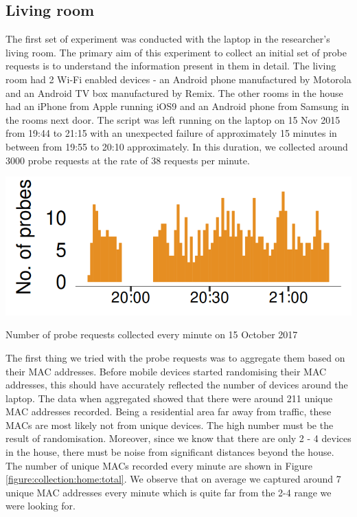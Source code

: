 \subsection{Living room}
The first set of experiment was conducted with the laptop in the researcher's living room.
The primary aim of this experiment to collect an initial set of probe requests is to understand the information present in them in detail.
The living room had 2 Wi-Fi enabled devices - an Android phone manufactured by Motorola and an Android TV box manufactured by Remix.
The other rooms in the house had an iPhone from Apple running iOS9 and an Android phone from Samsung in the rooms next door.
The script was left running on the laptop on 15 Nov 2015 from 19:44 to 21:15 with an unexpected failure of approximately 15 minutes in between from 19:55 to 20:10 approximately.
In this duration, we collected around 3000 probe requests at the rate of 38 requests per minute.

\begin{marginfigure}[-5cm]
  \includegraphics{images/home-total-count.png}
  \caption{Number of probe requests collected every minute on 15 October 2017}
  \label{figure:collection:home:total}
\end{marginfigure}

The first thing we tried with the probe requests was to aggregate them based on their MAC addresses.
Before mobile devices started randomising their MAC addresses, this should have accurately reflected the number of devices around the laptop.
The data when aggregated showed that there were around 211 unique MAC addresses recorded.
Being a residential area far away from traffic, these MACs are most likely not from unique devices.
The high number must be the result of randomisation.
Moreover, since we know that there are only 2 - 4 devices in the house, there must be noise from significant distances beyond the house.
The number of unique MACs recorded every minute are shown in Figure \ref{figure:collection:home:total}.
We observe that on average we captured around 7 unique MAC addresses every minute which is quite far from the 2-4 range we were looking for.

